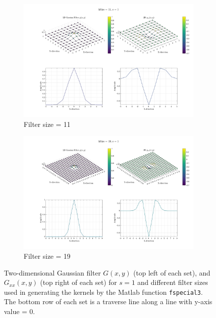 \documentclass{edger}
\begin{document}
\begin{figure}[!hb]
    \begin{subfigure}[b]{0.4\textwidth}            
            \includegraphics[width=\textwidth]{"s = 1, hSize = 11_normalized"}
            \caption{Filter size = 11}
            \label{fig:Filter size 11}
    \end{subfigure}%
    \begin{subfigure}[b]{0.4\textwidth}
            \centering
            \includegraphics[width=\textwidth]{"s = 1, hSize = 19_normalized"}
            \caption{Filter size = 19}
            \label{fig:Filter size 19}
    \end{subfigure}
    
    \caption{Two-dimensional Gaussian filter $G(x,y)$ (top left of each set), and $G_{xx}(x,y)$ (top right of each set) for $s = 1$ and different filter sizes used in generating the kernels by the Matlab function \texttt{fspecial3}. The bottom row of each set is a traverse line along a line with y-axis value = 0.}
    \label{fig:Filters}
\end{figure}
\end{document}
